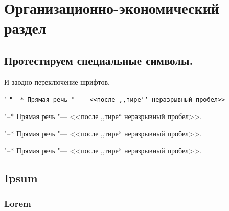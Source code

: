 \chapter{Организационно-экономический раздел}
\label{cha:econom}

\section{Протестируем специальные символы.}

И заодно переключение шрифтов.

\blindtext


{\shorthandoff" \texttt{"-{}-* Прямая речь "-{}-{}- <{}<после ,{},тире`{}` неразрывный пробел>{}>}}

{
"--* Прямая речь "--- <<после ,,тире`` неразрывный пробел>>.}

{
"--* Прямая речь "--- <<после ,,тире`` неразрывный пробел>>.}

{
"--* Прямая речь "--- <<после ,,тире`` неразрывный пробел>>.}

\section{Ipsum}
\subsection{Lorem}

\blindtext
